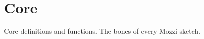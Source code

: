 \hypertarget{group__core}{}\section{Core}
\label{group__core}
Core definitions and functions. The bones of every Mozzi sketch. 